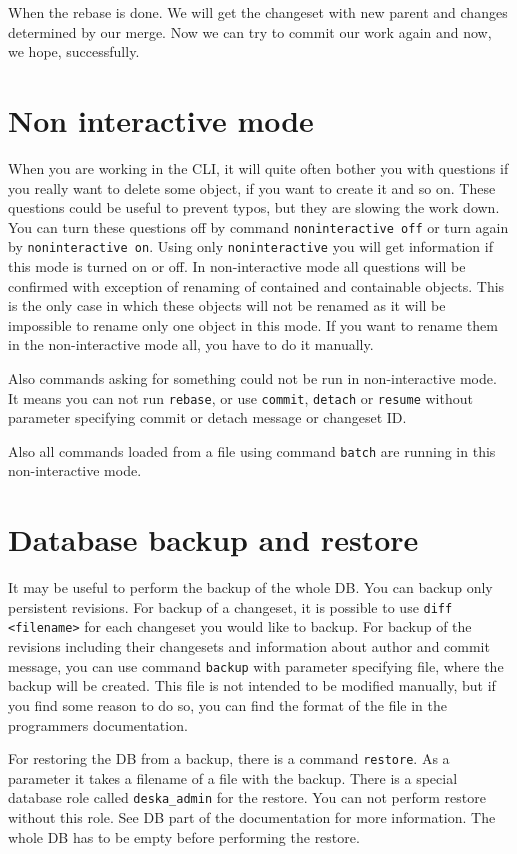 \documentclass[deska]{subfiles}
\begin{document}
When the rebase is done. We will get the changeset with new parent and changes determined by our merge. Now we can try to
commit our work again and now, we hope, successfully.

\section{Non interactive mode}

When you are working in the CLI, it will quite often bother you with questions if you really want to delete some object,
if you want to create it and so on. These questions could be useful to prevent typos, but they are slowing the work down.
You can turn these questions off by command {\tt noninteractive off} or turn again by {\tt noninteractive on}. Using
only {\tt noninteractive} you will get information if this mode is turned on or off. In non-interactive mode all
questions will be confirmed with exception of renaming of contained and containable objects. This is the only case in
which these objects will not be renamed as it will be impossible to rename only one object in this mode. If you want to
rename them in the non-interactive mode all, you have to do it manually.

Also commands asking for something could not be run in non-interactive mode. It means you can not run {\tt rebase}, or use
{\tt commit}, {\tt detach} or {\tt resume} without parameter specifying commit or detach message or changeset ID.

Also all commands loaded from a file using command {\tt batch} are running in this non-interactive mode.

\section{Database backup and restore}
\label{sec:cli-db-backup}

It may be useful to perform the backup of the whole DB. You can backup only persistent revisions. For backup of a
changeset, it is possible to use {\tt diff <filename>} for each changeset you would like to backup. For backup of the
revisions including their changesets and information about author and commit message, you can use command {\tt backup}
with parameter specifying file, where the backup will be created. This file is not intended to be modified manually,
but if you find some reason to do so, you can find the format of the file in the programmers documentation.

For restoring the DB from a backup, there is a command {\tt restore}. As a parameter it takes a filename of a file with
the backup. There is a special database role called {\tt deska\_admin} for the restore. You can not perform restore without this
role. See DB part of the documentation for more information. The whole DB has to be empty before performing the restore.
\end{document}
